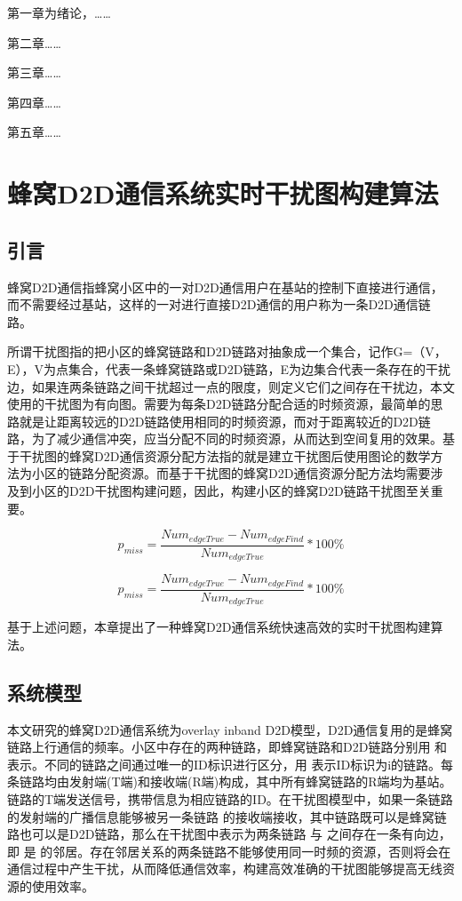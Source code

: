 \documentclass[figurelist,tablelist,algorithmlist,nomlist,masters]{seuthesix}
\begin{document}
	第一章为绪论，……
	
	第二章……
	
	第三章……
	
	第四章……
	
	第五章……
	
	\chapter{蜂窝D2D通信系统实时干扰图构建算法}
	\section{引言}
	蜂窝D2D通信指蜂窝小区中的一对D2D通信用户在基站的控制下直接进行通信，而不需要经过基站，这样的一对进行直接D2D通信的用户称为一条D2D通信链路。
	
	所谓干扰图指的把小区的蜂窝链路和D2D链路对抽象成一个集合，记作G=（V，E），V为点集合，代表一条蜂窝链路或D2D链路，E为边集合代表一条存在的干扰边，如果连两条链路之间干扰超过一点的限度，则定义它们之间存在干扰边，本文使用的干扰图为有向图。需要为每条D2D链路分配合适的时频资源，最简单的思路就是让距离较远的D2D链路使用相同的时频资源，而对于距离较近的D2D链路，为了减少通信冲突，应当分配不同的时频资源，从而达到空间复用的效果。基于干扰图的蜂窝D2D通信资源分配方法指的就是建立干扰图后使用图论的数学方法为小区的链路分配资源。而基于干扰图的蜂窝D2D通信资源分配方法均需要涉及到小区的D2D干扰图构建问题，因此，构建小区的蜂窝D2D链路干扰图至关重要。
	

	\[{p_{miss}} = \frac{{Nu{m_{edgeTrue}} - Nu{m_{edgeFind}}}}{{Nu{m_{edgeTrue}}}}*100\% \]
	
	
	
	\begin{equation}\label{eq2.1}
		{p_{miss}} = \frac{{Nu{m_{edgeTrue}} - Nu{m_{edgeFind}}}}{{Nu{m_{edgeTrue}}}}*100\% 
	\end{equation}
	
	基于上述问题，本章提出了一种蜂窝D2D通信系统快速高效的实时干扰图构建算法。
	
	\section{系统模型}
	本文研究的蜂窝D2D通信系统为overlay inband D2D模型，D2D通信复用的是蜂窝链路上行通信的频率。小区中存在的两种链路，即蜂窝链路和D2D链路分别用 和 表示。不同的链路之间通过唯一的ID标识进行区分，用 表示ID标识为i的链路。每条链路均由发射端(T端)和接收端(R端)构成，其中所有蜂窝链路的R端均为基站。链路的T端发送信号，携带信息为相应链路的ID。在干扰图模型中，如果一条链路 的发射端的广播信息能够被另一条链路 的接收端接收，其中链路既可以是蜂窝链路也可以是D2D链路，那么在干扰图中表示为两条链路 与 之间存在一条有向边，即 是 的邻居。存在邻居关系的两条链路不能够使用同一时频的资源，否则将会在通信过程中产生干扰，从而降低通信效率，构建高效准确的干扰图能够提高无线资源的使用效率。
	
\end{document}
